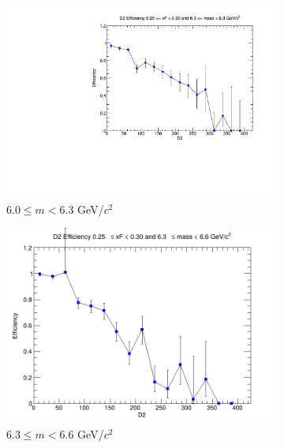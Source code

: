 \documentclass[11pt]{article}
\begin{document}
\begin{figure}[p]
\begin{subfigure}[b]{0.32\textwidth}
        \includegraphics[width=\textwidth]{./kTrackerEfficiencyPlots/D2_Efficiency_xF5_mass6.pdf}
        \caption{$6.0 \leq m < 6.3$ GeV/$c^2$}
    \end{subfigure}\hfill
    \begin{subfigure}[b]{0.32\textwidth}
        \centering
        \includegraphics[width=\textwidth]{./kTrackerEfficiencyPlots/D2_Efficiency_xF5_mass7.png}
        \caption{$6.3 \leq m < 6.6$ GeV/$c^2$}
    \end{subfigure}\hfill
    \begin{subfigure}[b]{0.32\textwidth}
        \centering

\end{subfigure}
\end{figure}
\end{document}
